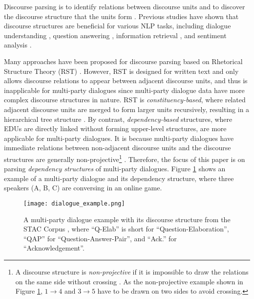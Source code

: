 \documentclass[letterpaper]{article} \usepackage{aaai19}  \usepackage{times}  \usepackage{helvet}  \usepackage{courier}  \usepackage{url}  \usepackage{graphicx}  \usepackage{amssymb}
\begin{document}
Discourse parsing is to identify relations between discourse units and to discover the discourse structure that the units form \cite{li2016discourse}. 
Previous studies have shown that discourse structures are beneficial for various NLP tasks, including 
dialogue understanding \cite{STACcorpus,Takanobu2018Weakly}, question answering \cite{verberne2007evaluating}, information retrieval \cite{seo2009online}, and sentiment analysis \cite{cambria2013new,bhatia2015better}.

Many approaches have been proposed for discourse parsing based on Rhetorical Structure Theory (RST) \cite{mann1988rhetorical}. 
However, RST is designed for written text and only allows discourse relations to appear between adjacent discourse units, and thus is inapplicable for multi-party dialogues \cite{afantenos2015discourse} since multi-party dialogue data have more complex discourse structures in nature.
 RST is \emph{constituency-based}, where related adjacent discourse units are merged to form larger units recursively, resulting in a hierarchical tree structure \cite{li2014recursive}. By contrast,  \emph{dependency-based} structures, where EDUs are directly linked without forming upper-level structures, are more applicable for multi-party dialogues. It is because multi-party dialogues have immediate relations between non-adjacent discourse units and the discourse structures are generally non-projective\footnote{A discourse structure is \emph{non-projective} if it is impossible to draw the relations on the same side without crossing \cite{mcdonald2005non}. As the non-projective example shown in Figure \ref{dialogue_example}, $1\rightarrow 4$ and $3\rightarrow 5$ have to be drawn on two sides to avoid crossing.} 
 \cite{morey2018dependency}.
Therefore, the focus of this paper is on parsing \emph{dependency structures} of multi-party dialogues.
Figure \ref{dialogue_example} shows an example of a multi-party dialogue and its dependency structure, where three speakers (A, B, C) are conversing in an online game. 

\begin{figure}[ht]
	\centering
	\texttt{[image: dialogue\_example.png]}
    \caption{A multi-party dialogue example with its discourse structure from the STAC Corpus \cite{STACcorpus}, where ``Q-Elab'' is short for ``Question-Elaboration'', ``QAP'' for ``Question-Answer-Pair'', and ``Ack.'' for ``Acknowledgement''.}
    \label{dialogue_example}
\end{figure}
\end{document}
